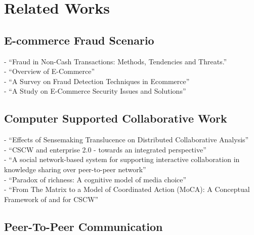 
\chapter{Related Works}
\label{cha:related_works}


\section{E-commerce Fraud Scenario}
\label{sec:related_e_commerce}

- ``Fraud in Non-Cash Transactions: Methods, Tendencies and Threats.'' \citep{sobko2014fraud} \\
- ``Overview of E-Commerce'' \citep{ankhule2015overview} \\
- ``A Survey on Fraud Detection Techniques in Ecommerce'' \citep{rana2015survey} \\
- ``A Study on E-Commerce Security Issues and Solutions'' \citep{sen2015study}


\section{Computer Supported Collaborative Work}
\label{sec:related_cscw}

- ``Effects of Sensemaking Translucence on Distributed Collaborative Analysis'' \citep{goyaleffects} \\
- ``CSCW and enterprise 2.0 - towards an integrated perspective'' \citep{Koch2008} \\
- ``A social network-based system for supporting interactive collaboration in knowledge sharing over peer-to-peer network'' \citep{yang2008social} \\
- ``Paradox of richness: A cognitive model of media choice'' \citep{robert2005paradox} \\
- ``From The Matrix to a Model of Coordinated Action (MoCA): A Conceptual Framework of and for CSCW'' \citep{lee2015matrix}


\section{Peer-To-Peer Communication}
\label{sec:related_p2p}


